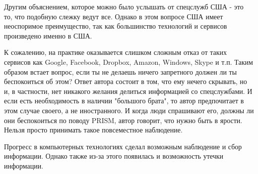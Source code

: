 \documentclass[10pt,a4paper]{article}
\begin{document}
Другим объяснением, которое можно было услышать от спецслужб США - это то, что подобную слежку ведут все. Однако в этом вопросе США имеет неоспоримое преимущество, так как большинство технологий и сервисов произведено именно в США.

К сожалению, на практике оказывается слишком сложным отказ от таких сервисов как Google, Facebook, Dropbox, Amazon, Windows, Skype и т.п. Таким образом встает вопрос, если ты не делаешь ничего запретного должен ли ты беспокоиться об этом? Ответ автора состоит в том, что ему нечего скрывать, но и, в частности, нет никакого желания делиться информацией со спецслужбами. И если есть необходимость в наличии "большого брата", то автор предпочитает в этом случае своего, а не иностранного. И когда люди спрашивают его, должны ли они беспокоиться по поводу PRISM, автор говорит, что нужно быть в ярости. Нельзя просто принимать такое повсеместное наблюдение.

Прогресс в компьютерных технологиях сделал возможным наблюдение и сбор информации. Однако также из-за этого появилась и возможность утечки информации.
\end{document}
